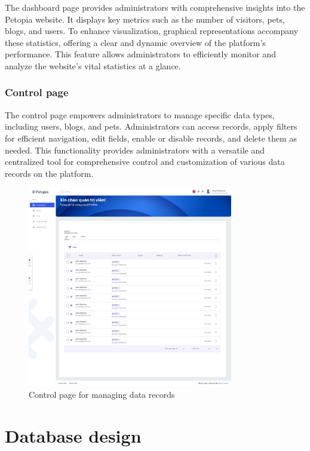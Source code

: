 The dashboard page provides administrators with comprehensive insights into the Petopia website. It displays key metrics such as the number of visitors, pets, blogs, and users. To enhance visualization, graphical representations accompany these statistics, offering a clear and dynamic overview of the platform's performance. This feature allows administrators to efficiently monitor and analyze the website's vital statistics at a glance.

\subsubsection{Control page}

The control page empowers administrators to manage specific data types, including users, blogs, and pets. Administrators can access records, apply filters for efficient navigation, edit fields, enable or disable records, and delete them as needed. This functionality provides administrators with a versatile and centralized tool for comprehensive control and customization of various data records on the platform.

\begin {figure}[H]
\centering
\includegraphics[width=0.8\textwidth]{Figures/control_bo_ui.jpg}
\caption{Control page for managing data records}
\end{figure}

\section{Database design}

